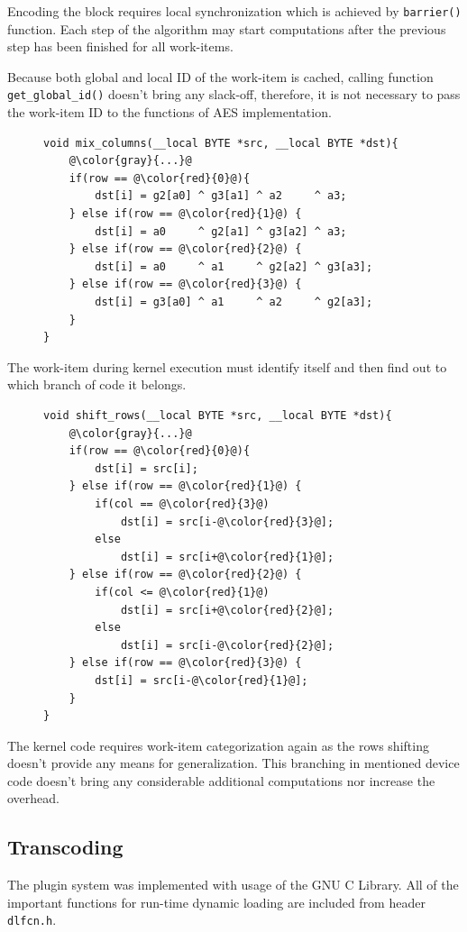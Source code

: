 Encoding the block requires local synchronization which is achieved by
\texttt{barrier()} function. Each step of the algorithm may start computations
after the previous step has been finished for all work-items.

Because both global and local ID of the work-item is cached, calling function 
\texttt{get\_global\_id()} doesn't bring any slack-off, therefore, it is not 
necessary to pass the work-item ID to the functions of AES implementation.

\begin{figure}[H]
\begin{lstlisting}
void mix_columns(__local BYTE *src, __local BYTE *dst){
    @\color{gray}{...}@
    if(row == @\color{red}{0}@){
        dst[i] = g2[a0] ^ g3[a1] ^ a2     ^ a3;
    } else if(row == @\color{red}{1}@) {
        dst[i] = a0     ^ g2[a1] ^ g3[a2] ^ a3;
    } else if(row == @\color{red}{2}@) {
        dst[i] = a0     ^ a1     ^ g2[a2] ^ g3[a3];
    } else if(row == @\color{red}{3}@) {
        dst[i] = g3[a0] ^ a1     ^ a2     ^ g2[a3];
    }
}
\end{lstlisting}
\end{figure}

The work-item during kernel execution must identify itself and then find out to 
which branch of code it belongs.

\begin{figure}[H]
\begin{lstlisting}
void shift_rows(__local BYTE *src, __local BYTE *dst){   
    @\color{gray}{...}@
    if(row == @\color{red}{0}@){
        dst[i] = src[i];
    } else if(row == @\color{red}{1}@) {
        if(col == @\color{red}{3}@)
            dst[i] = src[i-@\color{red}{3}@];
        else
            dst[i] = src[i+@\color{red}{1}@];
    } else if(row == @\color{red}{2}@) {
        if(col <= @\color{red}{1}@)
            dst[i] = src[i+@\color{red}{2}@];
        else
            dst[i] = src[i-@\color{red}{2}@];
    } else if(row == @\color{red}{3}@) {
        dst[i] = src[i-@\color{red}{1}@];
    }
}
\end{lstlisting}
\end{figure}

The kernel code requires work-item categorization again as the rows shifting 
doesn't provide any means for generalization. This branching in mentioned device
code doesn't bring any considerable additional computations nor increase the
overhead.

\subsection{Transcoding}
The plugin system was implemented with usage of the GNU C Library. All of the 
important functions for run-time dynamic loading are included from header
\texttt{dlfcn.h}.

